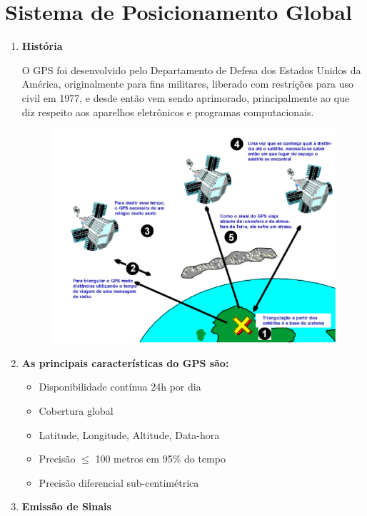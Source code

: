 \chapter[GPS]{Sistema de Posicionamento Global}

\begin{enumerate}
  \item \textbf{História}

  O GPS foi desenvolvido pelo Departamento de Defesa dos Estados Unidos da América, originalmente para fins militares, liberado com restrições para uso civil em 1977, e desde então vem sendo aprimorado, principalmente ao que diz respeito aos aparelhos eletrônicos e programas computacionais. \cite{usp2}

  \begin{figure}[h]
    \centering
    \includegraphics[width=400px, scale=0.5]{figuras/gps1}
    \label{table:gps}
  \end{figure}

  \item \textbf{As principais características do GPS são:}

  \begin{itemize}
    \item Disponibilidade contínua 24h por dia
    \item Cobertura global
    \item Latitude, Longitude, Altitude, Data-hora
    \item Precisão  $\leq$ 100 metros em 95\% do tempo
    \item Precisão diferencial sub-centimétrica
  \end{itemize}

  \item \textbf{Emissão de Sinais}


\end{enumerate}
